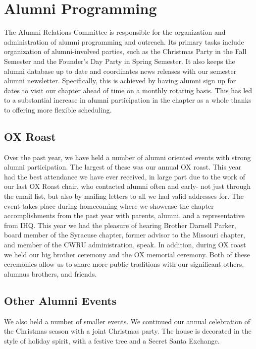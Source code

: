\chapter{Alumni Programming}

  The Alumni Relations Committee is responsible for the organization and administration of alumni programming and outreach. Its primary tasks include organization of alumni-involved parties, such as the Christmas Party in the Fall Semester and the Founder's Day Party in Spring Semester. It also keeps the alumni database up to date and coordinates news releases with our semester alumni newsletter. Specifically, this is achieved by having alumni sign up for dates to visit our chapter ahead of time on a monthly rotating basis. This has led to a substantial increase in alumni participation in the chapter as a whole thanks to offering more flexible scheduling.

  \section*{OX Roast}
    Over the past year, we have held a number of alumni oriented events with strong alumni participation. The largest of these was our annual OX roast. This year had the best attendance we have ever received, in large part due to the work of our last OX Roast chair, who contacted alumni often and early- not just through the email list, but also by mailing letters to all we had valid addresses for. The event takes place during homecoming where we showcase the chapter accomplishments from the past year with parents, alumni, and a representative from IHQ. This year we had the pleasure of hearing Brother Darnell Parker, board member of the Syracuse chapter, former advisor to the Missouri chapter, and member of the CWRU administration, speak. In addition, during OX roast we held our big brother ceremony and the OX memorial ceremony. Both of these ceremonies allow us to share more public traditions with our significant others, alumnus brothers, and friends.
    
  \section*{Other Alumni Events}
    We also held a number of smaller events. We continued our annual celebration of the Christmas season with a joint Christmas party. The house is decorated in the style of holiday spirit, with a festive tree and a Secret Santa Exchange. \\
    
